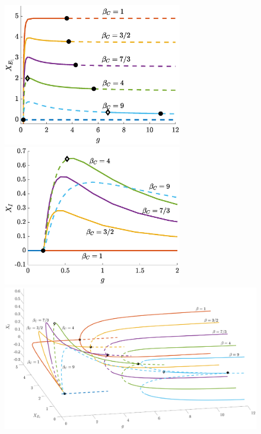 \documentclass[reqno]{siamonline190516}
\begin{document}
\begin{figure}
    \centering
    \includegraphics[width=7.8cm]{images/bdclusters100c10E.eps}
    \includegraphics[width=7.8cm]{images/bdclusters100c10Izoom.eps} 
    \vspace{-1cm}
    \includegraphics[width=16.5cm]{images/bdclusters100c103D.eps}

\end{figure}
\end{document}
